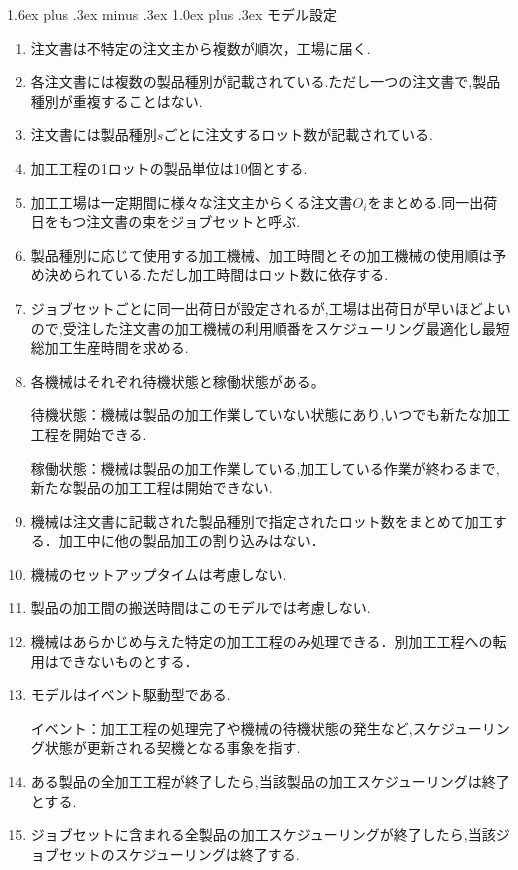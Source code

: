 \documentclass{jarticle}
\makeatletter
\renewcommand{\subsection}{%
  \@startsection{subsection}{2}{\z@}%
  {1.6ex plus .3ex minus .3ex}%
  {1.0ex plus .3ex}%
  {\LARGE\bfseries}%
}
\makeatother
\begin{document}
\subsection{モデル設定}
\begin{enumerate}
    \item 注文書は不特定の注文主から複数が順次，工場に届く.
    \item 各注文書には複数の製品種別が記載されている.ただし一つの注文書で,製品種別が重複することはない.
    \item 注文書には製品種別$s$ごとに注文するロット数が記載されている.
    \item 加工工程の1ロットの製品単位は10個とする.
    \item 加工工場は一定期間に様々な注文主からくる注文書$O_{i}$をまとめる.同一出荷日をもつ注文書の束をジョブセットと呼ぶ.
    \item 製品種別に応じて使用する加工機械、加工時間とその加工機械の使用順は予め決められている.ただし加工時間はロット数に依存する.
    \item ジョブセットごとに同一出荷日が設定されるが,工場は出荷日が早いほどよいので,受注した注文書の加工機械の利用順番をスケジューリング最適化し最短総加工生産時間を求める.
    \item 各機械はそれぞれ待機状態と稼働状態がある。
    
          待機状態：機械は製品の加工作業していない状態にあり,いつでも新たな加工工程を開始できる.

          稼働状態：機械は製品の加工作業している,加工している作業が終わるまで,新たな製品の加工工程は開始できない.
    \item 機械は注文書に記載された製品種別で指定されたロット数をまとめて加工する．加工中に他の製品加工の割り込みはない．
    \item 機械のセットアップタイムは考慮しない.
    \item 製品の加工間の搬送時間はこのモデルでは考慮しない.
    \item 機械はあらかじめ与えた特定の加工工程のみ処理できる．別加工工程への転用はできないものとする．
    \item モデルはイベント駆動型である.
    
          イベント：加工工程の処理完了や機械の待機状態の発生など,スケジューリング状態が更新される契機となる事象を指す.
    \item ある製品の全加工工程が終了したら,当該製品の加工スケジューリングは終了とする.
    \item ジョブセットに含まれる全製品の加工スケジューリングが終了したら,当該ジョブセットのスケジューリングは終了する.
    \end{enumerate}
\end{document}
